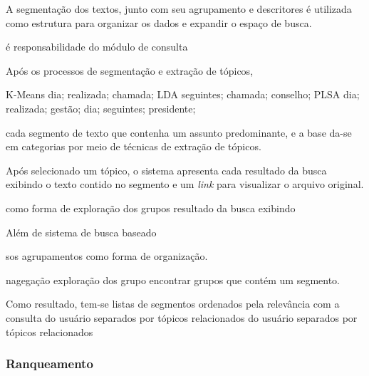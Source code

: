 A segmentação dos textos, junto com seu agrupamento e descritores é utilizada como estrutura para organizar os dados e expandir o espaço de busca.  

é responsabilidade do módulo de consulta 


Após os processos de segmentação e extração de tópicos, 










K-Means
dia; realizada; chamada;
LDA
seguintes; chamada; conselho;
PLSA
dia; realizada; gestão;
dia; seguintes; presidente;









cada segmento de texto que contenha um assunto predominante, e a base da-se em categorias por meio de técnicas de extração de tópicos. 


















Após selecionado um tópico, o sistema apresenta cada resultado da busca exibindo o texto contido no segmento e um \textit{link} para visualizar o arquivo original.	

como forma de exploração dos grupos 
resultado da busca exibindo 

Além de sistema de busca baseado 

sos agrupamentos como forma de organização. 

nagegação 
exploração dos grupo
encontrar grupos que contém um segmento.

Como resultado, tem-se listas de segmentos ordenados pela relevância com a consulta do usuário separados por tópicos relacionados 
do usuário separados por tópicos relacionados 









\subsubsection{Ranqueamento}



